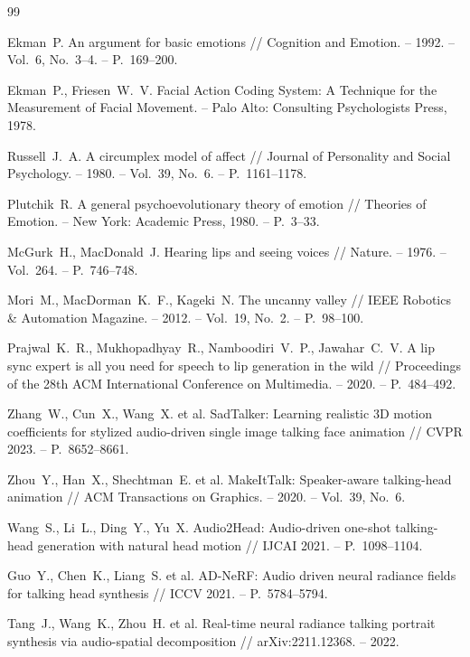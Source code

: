 \documentclass[a4paper, 12pt, oneside, openany]{article}
\begin{document}
\begin{thebibliography}{99}

Ekman~P. An argument for basic emotions // Cognition and Emotion. -- 1992. -- Vol.~6, No.~3--4. -- P.~169--200.

Ekman~P., Friesen~W.~V. Facial Action Coding System: A Technique for the Measurement of Facial Movement. -- Palo Alto: Consulting Psychologists Press, 1978.

Russell~J.~A. A circumplex model of affect // Journal of Personality and Social Psychology. -- 1980. -- Vol.~39, No.~6. -- P.~1161--1178.

Plutchik~R. A general psychoevolutionary theory of emotion // Theories of Emotion. -- New York: Academic Press, 1980. -- P.~3--33.

McGurk~H., MacDonald~J. Hearing lips and seeing voices // Nature. -- 1976. -- Vol.~264. -- P.~746--748.

Mori~M., MacDorman~K.~F., Kageki~N. The uncanny valley // IEEE Robotics \& Automation Magazine. -- 2012. -- Vol.~19, No.~2. -- P.~98--100.

Prajwal~K.~R., Mukhopadhyay~R., Namboodiri~V.~P., Jawahar~C.~V. A lip sync expert is all you need for speech to lip generation in the wild // Proceedings of the 28th ACM International Conference on Multimedia. -- 2020. -- P.~484--492.

Zhang~W., Cun~X., Wang~X. et al. SadTalker: Learning realistic 3D motion coefficients for stylized audio-driven single image talking face animation // CVPR 2023. -- P.~8652--8661.

Zhou~Y., Han~X., Shechtman~E. et al. MakeItTalk: Speaker-aware talking-head animation // ACM Transactions on Graphics. -- 2020. -- Vol.~39, No.~6.

Wang~S., Li~L., Ding~Y., Yu~X. Audio2Head: Audio-driven one-shot talking-head generation with natural head motion // IJCAI 2021. -- P.~1098--1104.

Guo~Y., Chen~K., Liang~S. et al. AD-NeRF: Audio driven neural radiance fields for talking head synthesis // ICCV 2021. -- P.~5784--5794.

Tang~J., Wang~K., Zhou~H. et al. Real-time neural radiance talking portrait synthesis via audio-spatial decomposition // arXiv:2211.12368. -- 2022.


\end{thebibliography}
\end{document}
